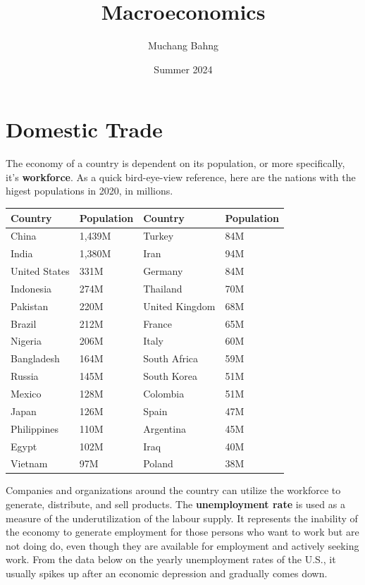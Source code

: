 \documentclass{article}
\begin{document}
\title{Macroeconomics}
\author{Muchang Bahng}
\date{Summer 2024}

\maketitle
\tableofcontents
\pagebreak

\section{Domestic Trade}

  The economy of a country is dependent on its population, or more specifically, it's \textbf{workforce}. As a quick bird-eye-view reference, here are the nations with the higest populations in 2020, in millions.

  \begin{table}[H]
    \begin{tabular}{llll}
    \hline
    Country & Population & Country & Population \\
    \hline
    China & 1,439M & Turkey & 84M \\
    India & 1,380M & Iran & 94M \\
    United States & 331M & Germany & 84M \\
    Indonesia & 274M & Thailand & 70M \\
    Pakistan & 220M & United Kingdom & 68M \\
    Brazil & 212M & France & 65M \\
    Nigeria & 206M & Italy & 60M \\
    Bangladesh & 164M & South Africa & 59M \\
    Russia & 145M & South Korea & 51M \\
    Mexico & 128M & Colombia & 51M \\
    Japan & 126M & Spain & 47M \\
    Philippines & 110M & Argentina & 45M \\
    Egypt & 102M & Iraq & 40M \\
    Vietnam & 97M & Poland & 38M \\
    \hline
    \end{tabular}
  \end{table}

  Companies and organizations around the country can utilize the workforce to generate, distribute, and sell products. The \textbf{unemployment rate} is used as a measure of the underutilization of the labour supply. It represents the inability of the economy to generate employment for those persons who want to work but are not doing do, even though they are available for employment and actively seeking work. From the data below on the yearly unemployment rates of the U.S., it usually spikes up after an economic depression and gradually comes down.
\end{document}
